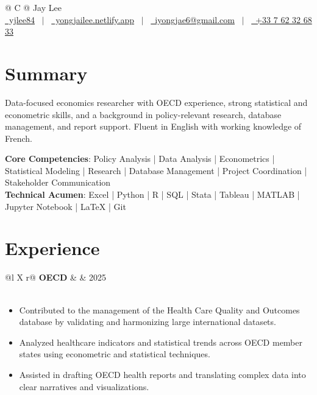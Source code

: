 \documentclass[a4paper,12pt]{article}
\makeatletter
\newenvironment{joblong}[3]
    {
    \begin{tabularx}{\linewidth}{@{}l X r@{}}
    \textbf{#1} & \hfill & #3 \\
    \multicolumn{3}{@{}l@{}}{\textit{#2}} \\[-4.25pt]
    \end{tabularx}
    \begin{itemize}[nosep,leftmargin=1em,itemsep=2pt,label={\raisebox{0.25ex}{\tiny$\bullet$}},topsep=0pt,partopsep=0pt]
    }
    {
    \end{itemize}
    }
\makeatother
\begin{document}
\pagestyle{empty} 


\begin{tabularx}{\linewidth}{@{} C @{}}
\Huge{Jay Lee} \\[6pt]
\href{https://github.com/yjlee84}{\raisebox{-0.05\height}\faGithub\ yjlee84} \ $|$ \ 
\href{https://yongjailee.netlify.app}{\raisebox{-0.05\height}\faGlobe \ yongjailee.netlify.app} \ $|$ \ 
\href{mailto:email@mysite.com}{\raisebox{-0.05\height}\faEnvelope \ iyongjae6@gmail.com} \ $|$ \ 
\href{tel:+000000000000}{\raisebox{-0.05\height}\faMobile \ +33 7 62 32 68 33} \\
\end{tabularx}


\section{Summary}
Data-focused economics researcher with OECD experience, strong statistical and econometric skills, and a background in policy-relevant research, database management, and report support. Fluent in English with working knowledge of French.

\textbf{Core Competencies}: Policy Analysis | Data Analysis | Econometrics | Statistical Modeling | Research | Database Management | Project Coordination | Stakeholder Communication\\
\textbf{Technical Acumen}: Excel | Python | R | SQL | Stata | Tableau | MATLAB | Jupyter Notebook | \LaTeX{} | Git

\section{Experience}

\begin{joblong}{OECD}{Intern Analyst}{2025}
\item Contributed to the management of the Health Care Quality and Outcomes database by validating and harmonizing large international datasets.
\item Analyzed healthcare indicators and statistical trends across OECD member states using econometric and statistical techniques.
\item Assisted in drafting OECD health reports and translating complex data into clear narratives and visualizations.
\end{joblong}
\end{document}
